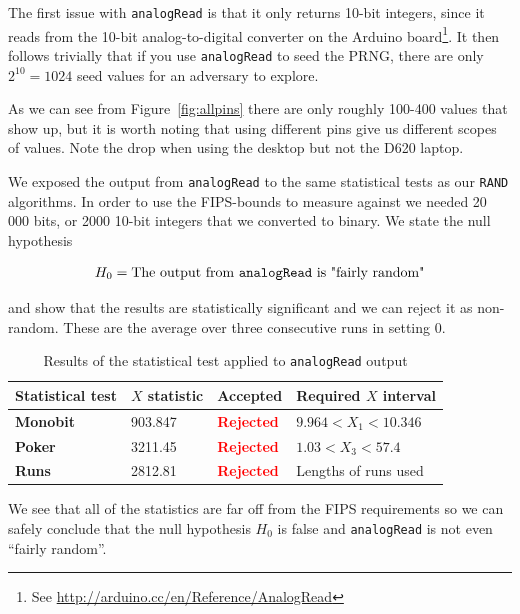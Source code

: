 \documentclass[a4paper]{article}           %
\begin{document}
The first issue with \texttt{analogRead} is that it only returns 10-bit integers, since it reads from the 10-bit analog-to-digital converter on the Arduino board\footnote{See \url{http://arduino.cc/en/Reference/AnalogRead}}. It then follows trivially that if you use \texttt{analogRead} to seed the PRNG, there are only $2^{10} = 1024$ seed values for an adversary to explore. 

As we can see from Figure~\ref{fig:allpins} there are only roughly 100-400 values that show up, but it is worth noting that using different pins give us different scopes of values. Note the drop when using the desktop but not the D620 laptop. 

We exposed the output from \texttt{analogRead} to the same statistical tests as our \texttt{RAND} algorithms. In order to use the FIPS-bounds to measure against we needed 20 000 bits, or 2000 10-bit integers that we converted to binary. We state the null hypothesis

\[
H_0 = \text{The output from \texttt{analogRead} is "fairly random"}
\]

and show that the results are statistically significant and we can reject it as non-random. These are the average over three consecutive runs in setting 0. 

  \begin{table}[H]
    \begin{center}
      \begin{tabular}{| l | l | l | l |}
        \hline
        Statistical test & $X$ statistic & Accepted & Required $X$ interval \\
        \hline
        \hline
        \textbf{Monobit} & 903.847 & \textcolor{red}{\textbf{Rejected}} & $9.964 < X_1 < 10.346$  \\
        \textbf{Poker} & 3211.45 & \textcolor{red}{\textbf{Rejected}} & $1.03 < X_3 < 57.4$ \\
        \textbf{Runs} & 2812.81 & \textcolor{red}{\textbf{Rejected}} & Lengths of runs used \\
        \hline
      \end{tabular}
    \end{center}
    \caption{Results of the statistical test applied to \texttt{analogRead} output}
    \label{tab:analogreadtests}
  \end{table}

We see that all of the statistics are far off from the FIPS requirements so we can safely conclude that the null hypothesis $H_0$ is false and \texttt{analogRead} is not even ``fairly random''. 
\end{document}
